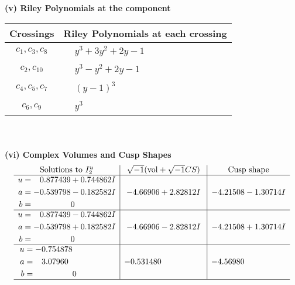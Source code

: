 \documentclass[1p]{elsarticle_modified}
\theoremstyle{definition}
\newcommand{\I}{\sqrt{-1}}
\begin{document}
\newpage\renewcommand{\arraystretch}{1}
\flushleft \textbf{(v) Riley Polynomials at the component}\newline \\
\begin{tabular}{m{50pt}|m{274pt}}
Crossings & \hspace{64pt}Riley Polynomials at each crossing \\
\hline $$\begin{aligned}c_{1},c_{3},c_{8}\end{aligned}$$&$\begin{aligned}
&y^3+3 y^2+2 y-1
\end{aligned}$\\
\hline $$\begin{aligned}c_{2},c_{10}\end{aligned}$$&$\begin{aligned}
&y^3- y^2+2 y-1
\end{aligned}$\\
\hline $$\begin{aligned}c_{4},c_{5},c_{7}\end{aligned}$$&$\begin{aligned}
&(y-1)^3
\end{aligned}$\\
\hline $$\begin{aligned}c_{6},c_{9}\end{aligned}$$&$\begin{aligned}
&y^3
\end{aligned}$\\
\hline
\end{tabular}\\~\\
\newpage\flushleft \textbf{(vi) Complex Volumes and Cusp Shapes}
$$\begin{array}{c|c|c}  
\text{Solutions to }I^u_{2}& \I (\text{vol} + \sqrt{-1}CS) & \text{Cusp shape}\\
 \hline 
\begin{aligned}
u &= \phantom{-}0.877439 + 0.744862 I \\
a &= -0.539798 - 0.182582 I \\
b &= \phantom{-0.000000 } 0\end{aligned}
 & -4.66906 + 2.82812 I & -4.21508 - 1.30714 I \\ \hline\begin{aligned}
u &= \phantom{-}0.877439 - 0.744862 I \\
a &= -0.539798 + 0.182582 I \\
b &= \phantom{-0.000000 } 0\end{aligned}
 & -4.66906 - 2.82812 I & -4.21508 + 1.30714 I \\ \hline\begin{aligned}
u &= -0.754878\phantom{ +0.000000I} \\
a &= \phantom{-}3.07960\phantom{ +0.000000I} \\
b &= \phantom{-0.000000 } 0\end{aligned}
 & -0.531480\phantom{ +0.000000I} & -4.56980\phantom{ +0.000000I}\\
 \hline 
 \end{array}$$\newpage
\end{document}
